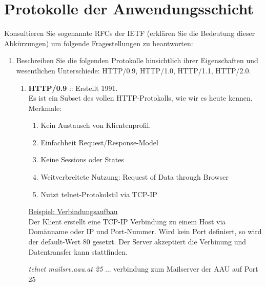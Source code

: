 \documentclass[11pt]{article}
\begin{document}
    \section{Protokolle der Anwendungsschicht}
    Konsultieren Sie sogenannte RFCs der IETF (erklären Sie die Bedeutung dieser
    Abkürzungen) um folgende Fragestellungen zu beantworten:

    \begin{enumerate}[\thesection .1]
    \item Beschreiben Sie die folgenden Protokolle hinsichtlich ihrer Eigenschaften und
wesentlichen Unterschiede: HTTP/0.9, HTTP/1.0, HTTP/1.1, HTTP/2.0.

    \begin{enumerate}[$\diamond$]
        \item \textbf{HTTP/0.9} :: Erstellt 1991.\\ Es ist ein Subset des vollen HTTP-Protokolls, wie wir es heute kennen.\\
        Merkmale:
        \begin{addmargin}[1em]{1em}
            \begin{enumerate}
                \item Kein Austausch von Klientenprofil.
                \item Einfachheit Request/Response-Model
                \item Keine Sessions oder States
                \item Weitverbreitete Nutzung: Request of Data through Browser
                \item Nutzt telnet-Protokolstil via TCP-IP\\
            \end{enumerate}
        \end{addmargin}

        \underline{Beispiel: Verbindungsaufbau}\\
        Der Klient erstellt eine TCP-IP Verbindung zu einem Host via Domänname oder IP und Port-Nummer.
        Wird kein Port definiert, so wird der default-Wert 80 gesetzt.
        Der Server akzeptiert die Verbinung und Datentransfer kann stattfinden.
    \begin{addmargin}[1em]{1em}
        \emph{telnet mailsrv.aau.at 25} ... verbindung zum Mailserver der AAU auf Port 25\\
    \end{addmargin}


\end{enumerate}
\end{enumerate}
\end{document}
